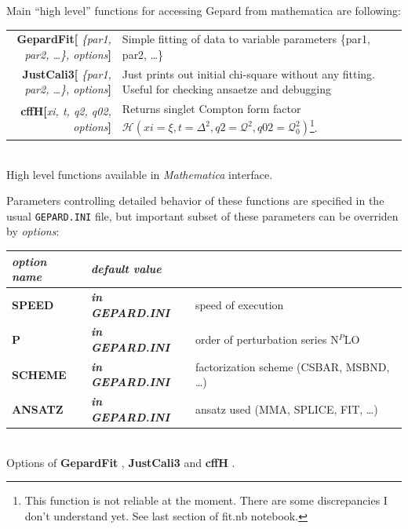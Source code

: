 \documentclass[12pt]{article}
\newcommand{\defboxitem}[3]{ {\ttfamily \bfseries #1[}\emph{#2}{\ttfamily \bfseries ]} & #3 }
\newcommand{\optboxitem}[3]{ {\ttfamily \bfseries #1} & {\ttfamily \bfseries #2 } & #3 }
\newcommand{\mmacomm}[1]{ {\ttfamily \bfseries #1} }
\begin{document}
Main ``high level'' functions for accessing Gepard from mathematica are following:

\begin{flushleft}
\colorbox{defbox}{%
\begin{minipage}{\textwidth}%
\begin{tabular}{rp{8cm}}%
\defboxitem{GepardFit}{ \{par1, par2, \ldots\}, options}{Simple fitting of data to 
variable parameters \{par1, par2, \ldots\}} \\[0.8ex]
\defboxitem{JustCali3}{ \{par1, par2, \ldots\}, options}{Just prints out initial chi-square without
any fitting. Useful for checking ansaetze and debugging}\\[0.8ex]
\defboxitem{cffH}{xi, t, q2, q02, options}{Returns singlet Compton form factor
$\mathcal{H}(xi=\xi, t=\Delta^2, q2=\mathcal{Q}^2, q02=\mathcal{Q}_{0}^2)$\footnote{
This function is not reliable at the moment. There are some discrepancies I don't
understand yet. See last section of fit.nb notebook.}.} 
\end{tabular}%
\end{minipage}}\\[0.5ex]
{\small High level functions available in \emph{Mathematica} interface.}
\end{flushleft}

Parameters controlling detailed behavior of these functions are specified in
the usual \texttt{GEPARD.INI} file, but important subset of these parameters can
be overriden by \emph{options}:

\begin{flushleft}
\colorbox{defbox}{%
\begin{minipage}{\textwidth}%
\begin{tabular}{llp{8cm}}%
\emph{option name} & \emph{default value} & \\ \hline
\optboxitem{SPEED}{\emph{in GEPARD.INI}}{speed of execution} \\
\optboxitem{P}{\emph{in GEPARD.INI}}{order of perturbation series N$^{P}$LO}\\
\optboxitem{SCHEME}{\emph{in GEPARD.INI}}{factorization scheme (CSBAR, MSBND, \ldots)}\\
\optboxitem{ANSATZ}{\emph{in GEPARD.INI}}{ansatz used (MMA, SPLICE, FIT, \ldots)}
\end{tabular}%
\end{minipage}}\\[0.5ex]
{\small Options of \mmacomm{GepardFit}, \mmacomm{JustCali3} and \mmacomm{cffH}.}
\end{flushleft}
\end{document}
